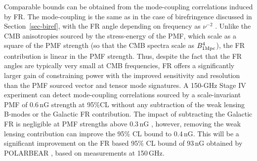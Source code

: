 Comparable bounds can be obtained from the mode-coupling correlations induced by FR. The mode-coupling is the same as in the case of birefringence discussed in Section~\ref{sec-biref}, with the FR angle depending on frequency as $\nu^{-2}$ \cite{Yadav:2012uz,De:2013dra,Pogosian:2013dya}. Unlike the CMB anisotropies sourced by the stress-energy of the PMF, which scale as a square of the PMF strength (so that the CMB spectra scale as $B^4_{1 {\rm Mpc}}$), the FR contribution is linear in the PMF strength. Thus, despite the fact that the FR angles are typically very small at CMB frequencies, FR offers a significantly larger gain of constraining power with the improved sensitivity and resolution \cite{Pogosian:2013dya} than the PMF sourced vector and tensor mode signatures. A 150-GHz Stage IV experiment can detect mode-coupling correlations sourced by a scale-invariant PMF of 0.6\,nG strength at 95\%CL without any subtraction of the weak lensing B-modes or the Galactic FR contribution. The impact of subtracting the Galactic FR is negligible at PMF strengths above 0.3\,nG \cite{De:2013dra}, however, removing the weak lensing contribution can improve the 95\% CL bound to 0.4\,nG. This will be a significant improvement on the FR based 95\% CL bound of 93\,nG obtained by POLARBEAR  \cite{Ade:2015cao}, based on measurements at 150\,GHz.

